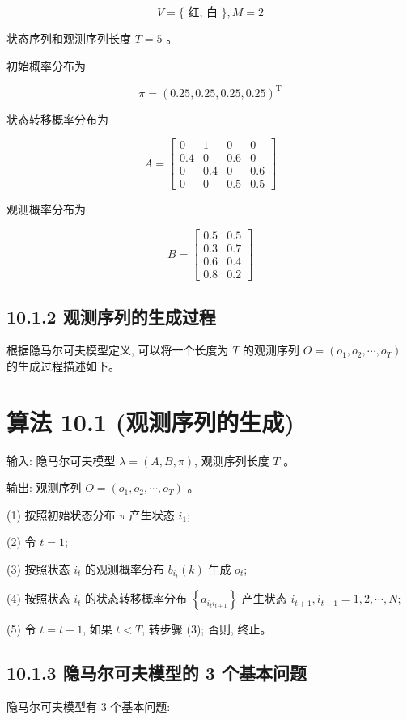\documentclass[10pt]{article}
\begin{document}
$$
V=\{\text { 红, 白 }\}, M=2
$$

状态序列和观测序列长度 $T=5$ 。

初始概率分布为

$$
\pi=(0.25,0.25,0.25,0.25)^{\mathrm{T}}
$$

状态转移概率分布为

$$
A=\left[\begin{array}{llll}
0 & 1 & 0 & 0 \\
0.4 & 0 & 0.6 & 0 \\
0 & 0.4 & 0 & 0.6 \\
0 & 0 & 0.5 & 0.5
\end{array}\right]
$$

观测概率分布为

$$
B=\left[\begin{array}{ll}
0.5 & 0.5 \\
0.3 & 0.7 \\
0.6 & 0.4 \\
0.8 & 0.2
\end{array}\right]
$$

\subsection*{10.1.2 观测序列的生成过程}
根据隐马尔可夫模型定义, 可以将一个长度为 $T$ 的观测序列 $O=\left(o_{1}, o_{2}, \cdots, o_{T}\right)$ 的生成过程描述如下。

\section*{算法 10.1 (观测序列的生成)}
输入: 隐马尔可夫模型 $\lambda=(A, B, \pi)$, 观测序列长度 $T$ 。

输出: 观测序列 $O=\left(o_{1}, o_{2}, \cdots, o_{T}\right)$ 。

(1) 按照初始状态分布 $\pi$ 产生状态 $i_{1}$;

(2) 令 $t=1$;

(3) 按照状态 $i_{t}$ 的观测概率分布 $b_{i_{t}}(k)$ 生成 $o_{t}$;

(4) 按照状态 $i_{t}$ 的状态转移概率分布 $\left\{a_{i_{t} i_{t+1}}\right\}$ 产生状态 $i_{t+1}, i_{t+1}=1,2, \cdots, N$;

(5) 令 $t=t+1$, 如果 $t<T$, 转步骤 (3); 否则, 终止。

\subsection*{10.1.3 隐马尔可夫模型的 3 个基本问题}
隐马尔可夫模型有 3 个基本问题:
\end{document}
